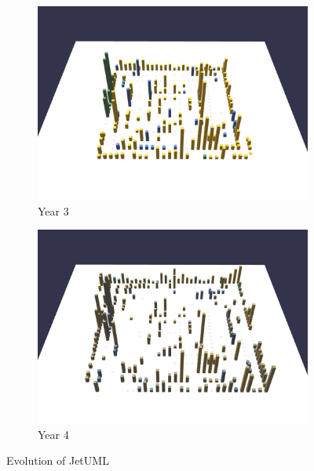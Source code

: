 \begin{figure}[ht]
    \medskip
    \begin{subfigure}{0.48\textwidth}
        \includegraphics[width=\linewidth]{JetUML_V3S3.png}
        \caption{Year 3} 
        \label{fig:JetUML_V3S3}
    \end{subfigure}\hspace*{\fill}
    \begin{subfigure}{0.48\textwidth}
        \includegraphics[width=\linewidth]{JetUML_V3S4.png}
        \caption{Year 4} 
        \label{fig:JetUML_V3S4}
    \end{subfigure}
        
    \caption{Evolution of JetUML} 
    \label{fig:JetUML_V3}
\end{figure}


